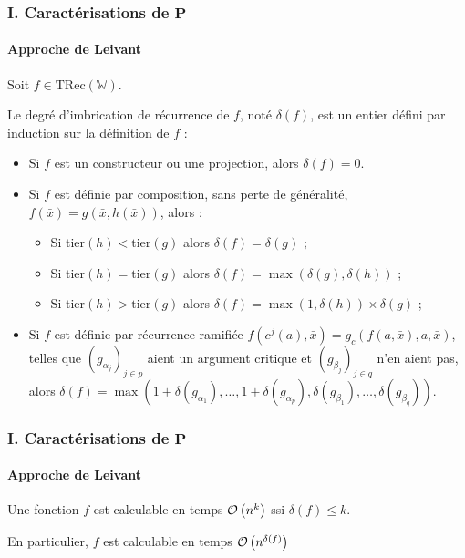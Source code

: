 \documentclass[10pt]{beamer}
\newcommand{\TRec}[1]{\text{TRec}\left(\mathbb{#1}\right)}
\begin{document}
	\begin{frame}
		\frametitle{I. Caractérisations de $\textbf{P}$}
		\framesubtitle{Approche de Leivant}
		
		
		\begin{defn}
			
			Soit $f \in \TRec{W}$. 
			
			Le degré d'imbrication de récurrence de $f$, noté $\delta(f)$, est un entier défini par induction sur la définition de $f$ :
			
			\begin{itemize}[itemsep=-1mm]
				\item 	Si $f$ est un constructeur ou une projection, alors $\delta(f) = 0$.
				\item 	Si $f$ est définie par composition, sans perte de généralité, $f(\bar{x}) = g\left( \bar{x}, h\left( \bar{x}\right)\right)$, alors :
				
				\begin{itemize}[itemsep=-1mm]
					\item 	Si $\text{tier}(h) < \text{tier}(g)$ alors $\delta(f) = \delta(g)$ ;
					\item 	Si $\text{tier}(h) = \text{tier}(g)$ alors $\delta(f) = \max\left(\delta(g), \delta(h)\right)$ ;
					\item 	Si $\text{tier}(h) > \text{tier}(g)$ alors $\delta(f) = \max\left(1, \delta(h)\right) \times \delta(g)$ ;
				\end{itemize}
				
				\item 	Si $f$ est définie par récurrence ramifiée $f(c^j(a), \bar{x}) = g_{c}\left( f(a, \bar{x}), a, \bar{x} \right)$, telles que $\left( g_{\alpha_j}\right)_{j\in p}$ aient un argument critique et $\left( g_{\beta_j}\right)_{j\in q}$ n'en aient pas, alors $\delta(f) = \max\left( 1 + \delta\left( g_{\alpha_1} \right), \dots,  1 + \delta\left( g_{\alpha_p} \right), \delta\left( g_{\beta_1} \right), \dots,  \delta\left( g_{\beta_q} \right)\right)$. 
			\end{itemize}
		\end{defn}
	\end{frame}
	
	\begin{frame}
		\frametitle{I. Caractérisations de $\textbf{P}$}
		\framesubtitle{Approche de Leivant}
		
		\begin{thm}
			Une fonction $f$ est calculable en temps $\mathcal{O}\left( n^k \right)$ ssi $\delta(f) \leqslant k$.
			
			En particulier, $f$ est calculable en temps $\mathcal{O}\left( n^{\delta(f)} \right)$
		\end{thm}
		
		
	\end{frame}
	
\end{document}
